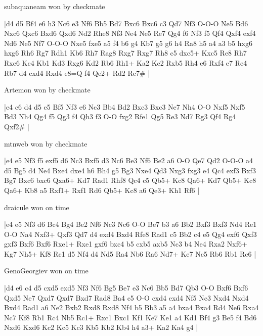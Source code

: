 \showboard

subaquaneam won by checkmate

\makegametitle
|d4 d5 Bf4 e6 h3 Nc6 e3 Nf6 Bb5 Bd7 Bxc6 Bxc6 c3 Qd7 Nf3 O-O-O Ne5 Bd6 Nxc6 Qxc6 Bxd6 Qxd6 Nd2 Rhe8 Nf3 Ne4 Ne5 Re7 Qg4 f6 Nf3 f5 Qf4 Qxf4 exf4 Nd6 Ne5 Nf7 O-O-O Nxe5 fxe5 a5 f4 b6 g4 Kb7 g5 g6 h4 Ra8 h5 a4 a3 b5 hxg6 hxg6 Rh6 Rg7 Rdh1 Kb6 Rh7 Rag8 Rxg7 Rxg7 Rh8 c5 dxc5+ Kxc5 Re8 Rh7 Rxe6 Kc4 Kb1 Kd3 Rxg6 Kd2 Rb6 Rh1+ Ka2 Kc2 Rxb5 Rh4 e6 Rxf4 e7 Re4 Rb7 d4 cxd4 Rxd4 e8=Q f4 Qe2+ Rd2 Rc7\#  |

\showboard

Artemon won by checkmate

\makegametitle
|e4 c6 d4 d5 e5 Bf5 Nf3 e6 Nc3 Bb4 Bd2 Bxc3 Bxc3 Ne7 Nh4 O-O Nxf5 Nxf5 Bd3 Nh4 Qg4 f5 Qg3 f4 Qh3 f3 O-O fxg2 Rfe1 Qg5 Re3 Nd7 Rg3 Qf4 Rg4 Qxf2\#  |

\showboard

mtnweb won by checkmate

\makegametitle
|e4 e5 Nf3 f5 exf5 d6 Nc3 Bxf5 d3 Nc6 Be3 Nf6 Be2 a6 O-O Qe7 Qd2 O-O-O a4 d5 Bg5 d4 Ne4 Bxe4 dxe4 h6 Bh4 g5 Bg3 Nxe4 Qd3 Nxg3 fxg3 e4 Qc4 exf3 Bxf3 Bg7 Bxc6 bxc6 Qxa6+ Kd7 Rad1 Rhf8 Qc4 c5 Qb5+ Kc8 Qa6+ Kd7 Qb5+ Kc8 Qa6+ Kb8 a5 Rxf1+ Rxf1 Rd6 Qb5+ Kc8 a6 Qe3+ Kh1 Rf6  |

\showboard

draicule won on time

\makegametitle
|e4 e5 Nf3 d6 Bc4 Bg4 Be2 Nf6 Nc3 Nc6 O-O Be7 b3 a6 Bb2 Bxf3 Bxf3 Nd4 Re1 O-O Na4 Nxf3+ Qxf3 Qd7 d4 exd4 Bxd4 Rfe8 Rad1 c5 Bb2 c4 e5 Qg4 exf6 Qxf3 gxf3 Bxf6 Bxf6 Rxe1+ Rxe1 gxf6 bxc4 b5 cxb5 axb5 Nc3 b4 Ne4 Rxa2 Nxf6+ Kg7 Nh5+ Kf8 Rc1 d5 Nf4 d4 Nd5 Ra4 Nb6 Ra6 Nd7+ Ke7 Nc5 Rb6 Rb1 Rc6  |

\showboard

GenoGeorgiev won on time

\makegametitle
|d4 e6 c4 d5 cxd5 exd5 Nf3 Nf6 Bg5 Be7 e3 Nc6 Bb5 Bd7 Qb3 O-O Bxf6 Bxf6 Qxd5 Ne7 Qxd7 Qxd7 Bxd7 Rad8 Ba4 c5 O-O cxd4 exd4 Nf5 Nc3 Nxd4 Nxd4 Bxd4 Rad1 a6 Ne2 Bxb2 Rxd8 Rxd8 Nf4 b5 Bb3 a5 a4 bxa4 Bxa4 Rd4 Ne6 Rxa4 Nc7 Kf8 Rb1 Rc4 Nb5 Rc1+ Rxc1 Bxc1 Kf1 Ke7 Ke1 a4 Kd1 Bf4 g3 Be5 f4 Bd6 Nxd6 Kxd6 Kc2 Kc5 Kc3 Kb5 Kb2 Kb4 h4 a3+ Ka2 Ka4 g4  |

